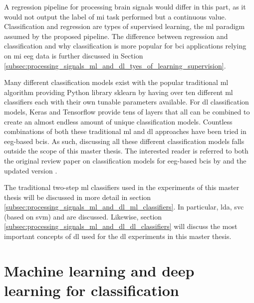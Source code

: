 A regression pipeline for processing brain signals would differ in this part, as it would not output the label of \gls{mi} task performed but a continuous value.
Classification and regression are types of supervised learning, the \gls{ml} paradigm assumed by the proposed pipeline.
The difference between regression and classification and why classification is more popular for \gls{bci} applications relying on \gls{mi} \gls{eeg} data is further discussed in Section \ref{subsec:processing_signals_ml_and_dl_tyes_of_learning_supervision}.

Many different classification models exist with the popular traditional \gls{ml} algorithm providing Python library \gls{sklearn} by \citet{sklearn} having over ten different \gls{ml} classifiers each with their own tunable parameters available.
For \gls{dl} classification models, Keras and Tensorflow \citep[Python \gls{dl} libraries by][]{keras, tensorflow} provide tens of layers that all can be combined to create an almost endless amount of unique classification models.
Countless combinations of both these traditional \gls{ml} and \gls{dl} approaches have been tried in \gls{eeg}-based \glspl{bci}.
As such, discussing all these different classification models falls outside the scope of this master thesis.
The interested reader is referred to both the original review paper on classification models for \gls{eeg}-based \glspl{bci} by \citet{eeg_based_bci_classification_models_old} and the updated version \citep{eeg_based_bci_classification_models}.

The traditional two-step \gls{ml} classifiers used in the experiments of this master thesis will be discussed in more detail in section \ref{subsec:processing_signals_ml_and_dl_ml_classifiers}.
In particular, \gls{lda}, \gls{svc} (based on \gls{svm}) and  are discussed.
Likewise, section \ref{subsec:processing_signals_ml_and_dl_dl_classifiers} will discuss the most important concepts of \gls{dl} used for the \gls{dl} experiments in this master thesis.




\section{Machine learning and deep learning for classification}
\label{sec:processing_signals_ml_and_dl}

